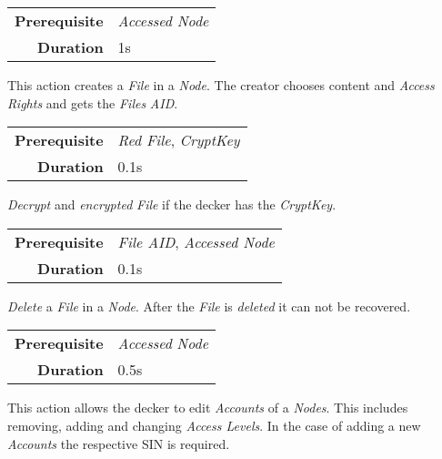 \begin{tabular}{rl}
    \textbf{Prerequisite} & \emph{Accessed Node} \\
    \textbf{Duration}     & 1s                   \\
\end{tabular}

\hfill

This action creates a \emph{File} in a \emph{Node}. The creator chooses content and
\emph{Access Rights} and gets the \emph{Files} \emph{AID}.

\label{par:decrypt}

\begin{tabular}{rl}
    \textbf{Prerequisite} & \emph{Red File}, \emph{CryptKey} \\
    \textbf{Duration}     & 0.1s                             \\
\end{tabular}

\hfill

\emph{Decrypt} and \emph{encrypted} \emph{File} if the decker has the \emph{CryptKey}.

\label{par:delete file}

\begin{tabular}{rl}
    \textbf{Prerequisite} & \emph{File AID}, \emph{Accessed Node} \\
    \textbf{Duration}     & 0.1s                                  \\
\end{tabular}

\hfill

\emph{Delete} a \emph{File} in a \emph{Node}. After the \emph{File} is
\emph{deleted} it can not be recovered.

\label{par:edit accounts}


\begin{tabular}{rl}
    \textbf{Prerequisite} & \emph{Accessed} \emph{Node} \\
    \textbf{Duration}     & 0.5s                        \\
\end{tabular}

\hfill

This action allows the decker to edit \emph{Accounts} of a \emph{Nodes}. This
includes removing, adding and changing \emph{Access Levels}. In the case of adding
a new \emph{Accounts} the respective SIN is required.

